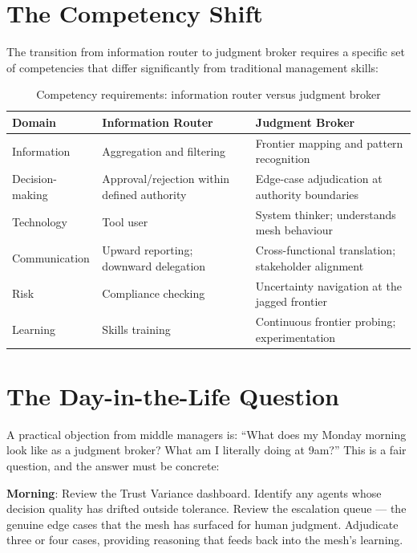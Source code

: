 \section{The Competency Shift}

The transition from information router to judgment broker requires a specific set of competencies that differ significantly from traditional management skills:

\begin{table}[h]
\centering
\caption{Competency requirements: information router versus judgment broker}
\label{tab:competency-shift}
\begin{tabularx}{\textwidth}{l X X}
\toprule
\textbf{Domain} & \textbf{Information Router} & \textbf{Judgment Broker} \\
\midrule
Information & Aggregation and filtering & Frontier mapping and pattern recognition \\
\addlinespace
Decision-making & Approval/rejection within defined authority & Edge-case adjudication at authority boundaries \\
\addlinespace
Technology & Tool user & System thinker; understands mesh behaviour \\
\addlinespace
Communication & Upward reporting; downward delegation & Cross-functional translation; stakeholder alignment \\
\addlinespace
Risk & Compliance checking & Uncertainty navigation at the jagged frontier \\
\addlinespace
Learning & Skills training & Continuous frontier probing; experimentation \\
\bottomrule
\end{tabularx}
\end{table}

\section{The Day-in-the-Life Question}

A practical objection from middle managers is: ``What does my Monday morning look like as a judgment broker? What am I literally doing at 9am?'' This is a fair question, and the answer must be concrete:

\textbf{Morning}: Review the Trust Variance dashboard. Identify any agents whose decision quality has drifted outside tolerance. Review the escalation queue --- the genuine edge cases that the mesh has surfaced for human judgment. Adjudicate three or four cases, providing reasoning that feeds back into the mesh's learning.

